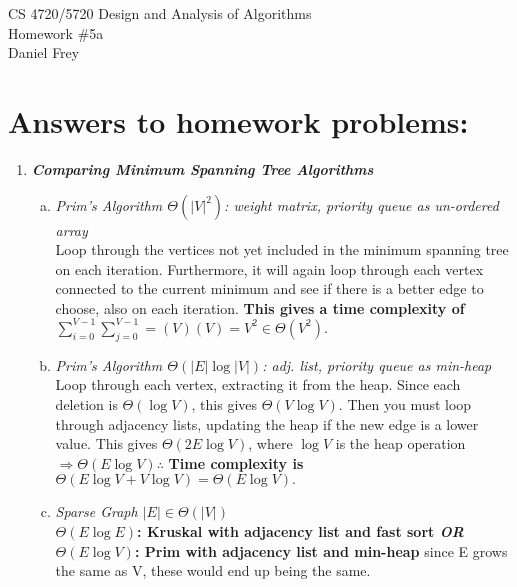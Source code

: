 \documentclass[11pt]{article}
\begin{document}
 

\rhead{\today}

\begin{center}
\begin{Large}
	CS 4720/5720 Design and Analysis of Algorithms \\
	Homework \#5a \\
	Daniel Frey
\end{Large}
\end{center}

\section*{Answers to homework problems:}

\begin{enumerate}
	\item
		\textbf{\textit{Comparing Minimum Spanning Tree Algorithms}}

		\begin{enumerate}[(a)]
			\item
				\textit{Prim's Algorithm $ \Theta(|V|^2) $: weight matrix, priority queue as un-ordered array} \\
					\hspace*{.5cm}
					Loop through the vertices not yet included in the minimum spanning tree on each iteration. Furthermore, it will again loop through each vertex connected to the current minimum and see if there is a better edge to choose, also on each iteration. \textbf{This gives a time complexity of $ \sum_{i=0}^{V-1} \sum_{j=0}^{V-1} = (V)(V) = V^2 \in \Theta(V^2). $} \\

			\item
				\textit{Prim's Algorithm $ \Theta(|E| \log{|V|}) $: adj. list, priority queue as min-heap} \\
					\hspace*{.5cm}
					Loop through each vertex, extracting it from the heap. Since each deletion is $ \Theta(\log V) $, this gives $ \Theta(V \log V). $ Then you must loop through adjacency lists, updating the heap if the new edge is a lower value. This gives $ \Theta(2E \log V) $, where $ \log V $ is the heap operation $ \Rightarrow \Theta(E \log V) \therefore $ \textbf{Time complexity is $ \Theta(E \log V + V \log V) = \Theta(E \log V). $} \\
				
			\item 
				\textit{Sparse Graph $ |E| \in \Theta(|V|) $} \\
				\textbf{$ \Theta(E \log E) $: Kruskal with adjacency list and fast sort \textit{OR} $ \Theta(E \log V) $: Prim with adjacency list and min-heap} since E grows the same as V, these would end up being the same. \\


\end{enumerate}
\end{enumerate}
\end{document}
